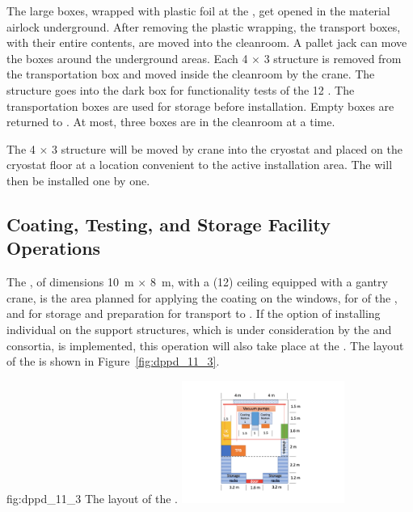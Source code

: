 The large  boxes, wrapped with plastic foil at the , get opened in the material airlock underground. After removing the plastic wrapping, the transport boxes, with their entire contents, are moved into the cleanroom. A pallet jack can move the   boxes around the underground areas. Each \num{4} $\times$ \num{3} structure is removed from the transportation box and moved inside the cleanroom by the crane. The structure goes into the dark box for functionality tests of the \num{12} . The transportation boxes are used for storage before installation. Empty boxes are returned to . At most, three  boxes are in the cleanroom at a time.

The \num{4} $\times$ \num{3} structure will be moved by crane into the cryostat and placed on the cryostat floor at a location convenient to the active installation area. The  will then be installed one by one. 

\subsection{Coating, Testing, and Storage Facility Operations}
\label{subsec:dp-pds-itf}

The , of dimensions \SI{10}{\m} $\times$ \SI{8}{\m}, with a (\SI{12}{\ft}) ceiling equipped with a gantry crane, is the area planned for applying the  coating on the  windows, for  of the , and for storage and preparation for transport to . If the option of installing individual  on the  support structures, which is under consideration by the \dual {} and  consortia, is %
implemented, this operation will also take place at the . The layout of the  is shown in Figure~\ref{fig:dppd_11_3}.

\begin{dunefigure}{fig:dppd_11_3}
{The layout of the .}
\includegraphics[width=0.4\textwidth]{graphics/dppd_11_3}
\end{dunefigure}

